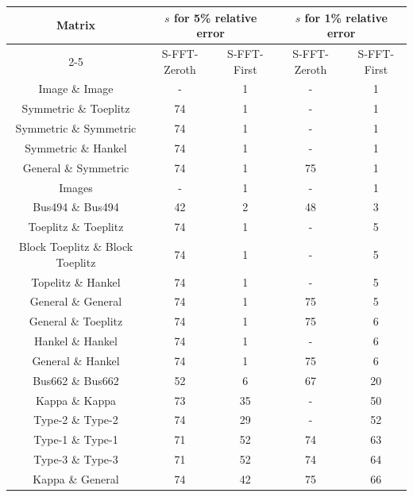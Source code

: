 \documentclass[onefignum,onetabnum]{siamart171218}
\begin{document}
\begin{table}[]
    \centering
    \begin{tabular}{|c|c|c|c|c|}
        \hline
        \multirow{2}{*}{Matrix} & \multicolumn{2}{c|}{$s$ for 5\% relative error} & \multicolumn{2}{c|}{$s$ for 1\% relative error}\\
        \cline{2-5}
        &S-FFT-Zeroth& S-FFT-First &S-FFT-Zeroth& S-FFT-First\\
         \hline
	Image \& Image & - & 1 & - &1\\
    \hline
         Symmetric \& Toeplitz & 74 & 1& -& 1\\
         \hline
         Symmetric \& Symmetric& 74 & 1& -& 1  \\
         \hline
         Symmetric \& Hankel&  74& 1& - & 1\\
         \hline
         General \& Symmetric& 74 & 1& 75 & 1\\
         \hline
         Images\footnotemark[1] & - & 1&- &1  \\
         \hline
         Bus494 \& Bus494\footnotemark[2] &42  & 2& 48& 3  \\
         \hline
         Toeplitz \& Toeplitz & 74  & 1& -& 5 \\
         \hline
         Block Toeplitz \& Block Toeplitz &74 &1 & -& 5 \\
         \hline
         Topelitz \& Hankel& 74 & 1 &- & 5  \\
         \hline
         General \& General& 74 & 1& 75 & 5  \\
         \hline
        General \& Toeplitz & 74 & 1 & 75 &6  \\
         \hline
        Hankel \& Hankel& 74 & 1& - & 6 \\
         \hline
         General \& Hankel& 74 & 1 & 75& 6   \\
         \hline
         Bus662 \& Bus662\footnotemark[3] &52  &6 & 67& 20  \\
         \hline
         Kappa \& Kappa& 73 &35 & -& 50  \\
         \hline
          Type-2 \& Type-2\footnotemark[4]& 74& 29 & -& 52 \\
         \hline
         Type-1 \& Type-1\footnotemark[4]& 71 &52 & 74& 63 \\        
         \hline
         Type-3 \& Type-3\footnotemark[4]&71  & 52&74 & 64   \\
         \hline
         Kappa \& General& 74 & 42& 75& 66 \\

\end{tabular}
\end{table}
\end{document}

